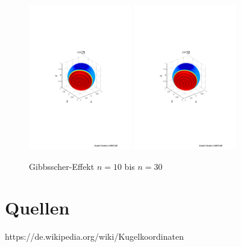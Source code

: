 \begin{refsection}
\begin{figure}
\includegraphics[width=0.4\textwidth]{kugel/Gibbs/GibbsN_25.pdf}
\includegraphics[width=0.4\textwidth]{kugel/Gibbs/GibbsN_30.pdf}
\caption{Gibbsscher-Effekt $n=10$ bis $n=30$
\label{skript:Gibbs2}}
\end{figure}

\section{Quellen}

https://de.wikipedia.org/wiki/Kugelkoordinaten


\printbibliography[heading=subbibliography]
\end{refsection}